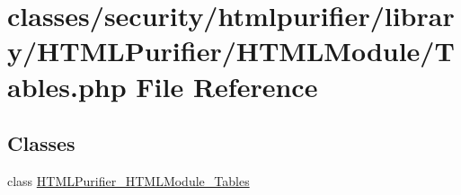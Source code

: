 \hypertarget{Tables_8php}{\section{classes/security/htmlpurifier/library/\+H\+T\+M\+L\+Purifier/\+H\+T\+M\+L\+Module/\+Tables.php File Reference}
\label{Tables_8php}
}
\subsection*{Classes}
\begin{DoxyCompactItemize}
\item 
class \hyperlink{classHTMLPurifier__HTMLModule__Tables}{H\+T\+M\+L\+Purifier\+\_\+\+H\+T\+M\+L\+Module\+\_\+\+Tables}
\end{DoxyCompactItemize}
